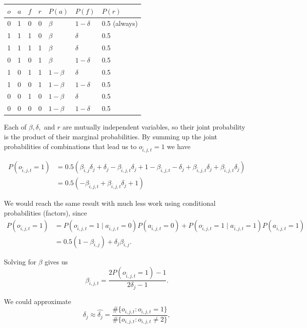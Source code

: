 \documentclass[11pt]{article}
\begin{document}
\begin{longtable}[]{@{}lllllll@{}}
\toprule
\(o\) & \(a\) & \(f\) & \(r\) & \(P(a)\) & \(P(f)\) & \(P(r)\) \\
\midrule
\endhead
0 & 1 & 0 & 0 & \(\beta\) & \(1-\delta\) & 0.5 (always) \\
1 & 1 & 1 & 0 & \(\beta\) & \(\delta\) & 0.5 \\
1 & 1 & 1 & 1 & \(\beta\) & \(\delta\) & 0.5 \\
0 & 1 & 0 & 1 & \(\beta\) & \(1-\delta\) & 0.5 \\
1 & 0 & 1 & 1 & \(1-\beta\) & \(\delta\) & 0.5 \\
1 & 0 & 0 & 1 & \(1-\beta\) & \(1-\delta\) & 0.5 \\
0 & 0 & 1 & 0 & \(1-\beta\) & \(\delta\) & 0.5 \\
0 & 0 & 0 & 0 & \(1-\beta\) & \(1-\delta\) & 0.5 \\
\bottomrule
\end{longtable}

Each of \(\beta,\delta,\) and \(r\) are mutually independent variables,
so their joint probability is the product of their marginal
probabilities. By summing up the joint probabilities of combinations
that lead us to \(o_{\bar{i},j,t}=1\) we have

\begin{align}
P(o_{\bar{i},j,t}=1) &= 0.5(\beta_{\bar{i},j}\delta_j + \delta_j - \beta_{\bar{i},j,t}\delta_j + 1 - \beta_{\bar{i},j,t} - \delta_j + \beta_{\bar{i},j,t}\delta_j + \beta_{\bar{i},j,t}\delta_j)\\
       &= 0.5(-\beta_{\bar{i},j,t} + \beta_{\bar{i},j,t}\delta_j + 1)
\end{align}

We would reach the same result with much less work using conditional
probabilities (factors), since \begin{align}
P(o_{\bar{i},j,t}=1) &= P(o_{\bar{i},j,t}=1 \mid a_{\bar{i},j,t}=0) P(a_{\bar{i},j,t}=0) + P(o_{\bar{i},j,t}=1 \mid a_{\bar{i},j,t}=1) P(a_{\bar{i},j,t}=1)\\
&= 0.5(1-\beta_{\bar{i},j}) + \delta_j \beta_{\bar{i},j}.
\end{align}

Solving for \(\beta\) gives us
\[\beta_{\bar{i},j,t} = \frac{2P(o_{\bar{i},j,t}=1) - 1}{2\delta_j - 1}.\]

    We could approximate
\[\delta_j \approx \hat{\delta_j} = \frac{ \# \{o_{i,j,t} : o_{i,j,t}=1\}}{ \# \{o_{i,j,t} : o_{i,j,t}\neq 2 \} },\]
\end{document}
